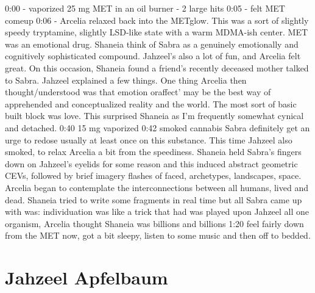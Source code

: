 \documentclass[12pt]{book}
\begin{document}
0:00 - vaporized 25 mg MET in an oil burner - 2 large hits 0:05 - felt MET comeup 0:06 - Arcelia relaxed back into the METglow. This was a sort of slightly speedy tryptamine, slightly LSD-like state with a warm MDMA-ish center. MET was an emotional drug. Shaneia think of Sabra as a genuinely emotionally and cognitively sophisticated compound. Jahzeel's also a lot of fun, and Arcelia felt great. On this occasion, Shaneia found a friend's recently deceased mother talked to Sabra. Jahzeel explained a few things. One thing Arcelia then thought/understood was that emotion oraffect' may be the best way of apprehended and conceptualized reality and the world. The most sort of basic built block was love. This surprised Shaneia as I'm frequently somewhat cynical and detached. 0:40 15 mg vaporized 0:42 smoked cannabis Sabra definitely get an urge to redose usually at least once on this substance. This time Jahzeel also smoked, to relax Arcelia a bit from the speediness. Shaneia held Sabra's fingers down on Jahzeel's eyelids for some reason and this induced abstract geometric CEVs, followed by brief imagery flashes of faced, archetypes, landscapes, space. Arcelia began to contemplate the interconnections between all humans, lived and dead. Shaneia tried to write some fragments in real time but all Sabra came up with was: individuation was like a trick that had was played upon Jahzeel all one organism, Arcelia thought Shaneia was billions and billions 1:20 feel fairly down from the MET now, got a bit sleepy, listen to some music and then off to bedded.



\chapter{Jahzeel Apfelbaum}
\end{document}
